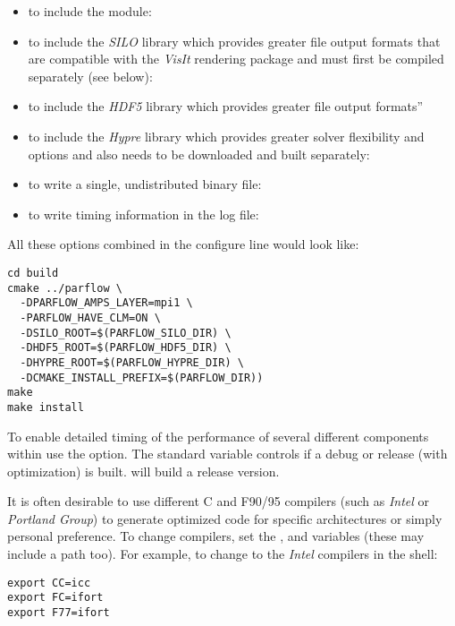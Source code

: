 \begin{enumerate}
\begin{itemize}
\item to include the  module:  
\item to include the \emph{SILO} 
library which provides greater file output formats that are compatible
with the \emph{VisIt} rendering package and must first be compiled 
separately (see below): 
\item to include the \emph{HDF5} 
library which provides greater file output formats'' 
\item to include the \emph{Hypre} library which provides greater solver
flexibility and options and also needs to be downloaded and built separately:
\item to write a single, undistributed \parflow{} binary file:
\item to write timing information in the log file: 
\end{itemize}

All these options combined in the configure line would look like:

\begin{display}\begin{verbatim}
cd build
cmake ../parflow \
  -DPARFLOW_AMPS_LAYER=mpi1 \
  -PARFLOW_HAVE_CLM=ON \
  -DSILO_ROOT=$(PARFLOW_SILO_DIR) \
  -DHDF5_ROOT=$(PARFLOW_HDF5_DIR) \
  -DHYPRE_ROOT=$(PARFLOW_HYPRE_DIR) \
  -DCMAKE_INSTALL_PREFIX=$(PARFLOW_DIR)) 
make 
make install
\end{verbatim}\end{display}

To enable detailed timing of the performance of several different
components within \parflow{} use the  option.
The standard  variable controls if a debug or
release (with optimization) is built.
 will build a release version.

It is often desirable to use different C and F90/95 compilers (such as
\emph{Intel} or \emph{Portland Group}) to generate optimized code for
specific architectures or simply personal preference.  To change
compilers, set the \code{CC},  and  variables
(these may include a path too).  For example, to change to the
\emph{Intel} compilers in the  shell:
\begin{display}\begin{verbatim}
export CC=icc
export FC=ifort
export F77=ifort
\end{verbatim}\end{display}


\end{enumerate}
